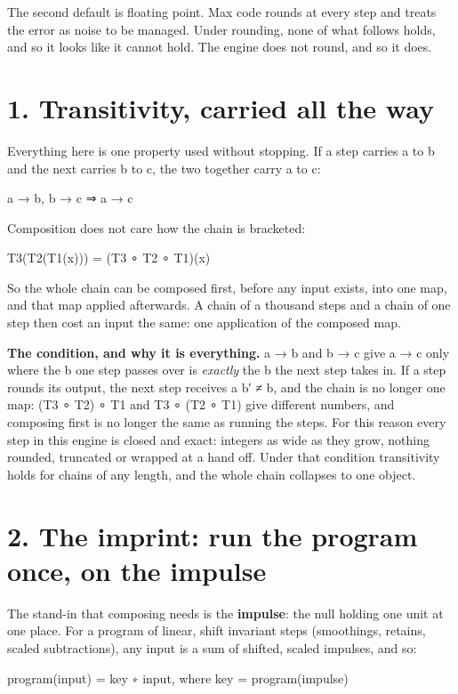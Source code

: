 The second default is floating point. Max code rounds at every step and treats the error as noise to be managed. Under rounding, none of what follows holds, and so it looks like it cannot hold. The engine does not round, and so it does.

\section{\texorpdfstring{1. Transitivity, carried all the way}{1. Transitivity, carried all the way}}

Everything here is one property used without stopping. If a step carries a to b and the next carries b to c, the two together carry a to c:

a → b,  b → c   ⇒   a → c

Composition does not care how the chain is bracketed:

T3(T2(T1(x))) = (T3 ∘ T2 ∘ T1)(x)

So the whole chain can be composed first, before any input exists, into one map, and that map applied afterwards. A chain of a thousand steps and a chain of one step then cost an input the same: one application of the composed map.

\textbf{The condition, and why it is everything.} a → b and b → c give a → c only where the b one step passes over is \emph{exactly} the b the next step takes in. If a step rounds its output, the next step receives a b′ ≠ b, and the chain is no longer one map: (T3 ∘ T2) ∘ T1 and T3 ∘ (T2 ∘ T1) give different numbers, and composing first is no longer the same as running the steps. For this reason every step in this engine is closed and exact: integers as wide as they grow, nothing rounded, truncated or wrapped at a hand off. Under that condition transitivity holds for chains of any length, and the whole chain collapses to one object.

\section{\texorpdfstring{2. The imprint: run the program once, on the impulse}{2. The imprint: run the program once, on the impulse}}

The stand-in that composing needs is the \textbf{impulse}: the null holding one unit at one place. For a program of linear, shift invariant steps (smoothings, retains, scaled subtractions), any input is a sum of shifted, scaled impulses, and so:

program(input) = key ∗ input,    where  key = program(impulse)

